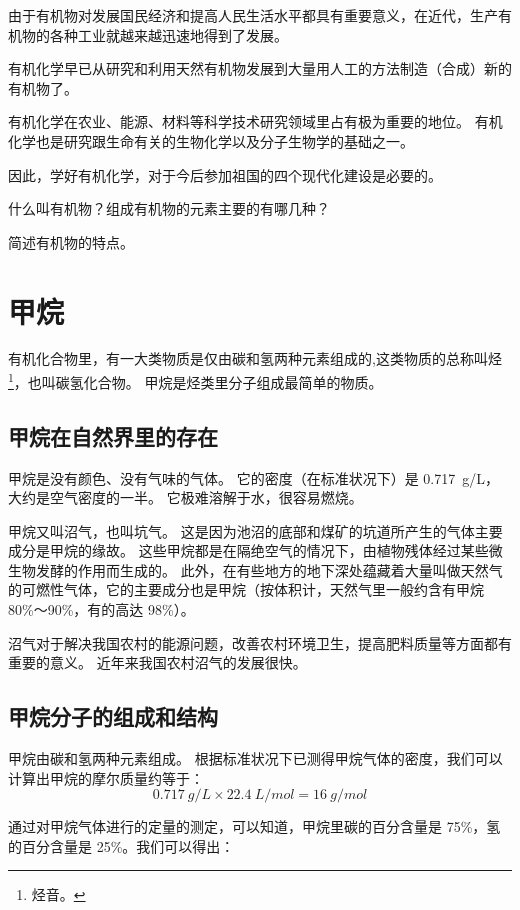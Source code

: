 由于有机物对发展国民经济和提高人民生活水平都具有重要意义，在近代，生产有机物的各种工业就越来越迅速地得到了发展。

有机化学早已从研究和利用天然有机物发展到大量用人工的方法制造（合成）新的有机物了。

有机化学在农业、能源、材料等科学技术研究领域里占有极为重要的地位。
有机化学也是研究跟生命有关的生物化学以及分子生物学的基础之一。

因此，学好有机化学，对于今后参加祖国的四个现代化建设是必要的。

\begin{Practice}[习题]
\begin{question}
  \item 什么叫有机物？组成有机物的元素主要的有哪几种？
  \item 简述有机物的特点。
\end{question}
\end{Practice}

\section{甲烷}
有机化合物里，有一大类物质是仅由碳和氢两种元素组成的,这类物质的总称叫烃\footnote{烃音。}，也叫碳氢化合物。
甲烷是烃类里分子组成最简单的物质。
\subsection{甲烷在自然界里的存在}
甲烷是没有颜色、没有气味的气体。
它的密度（在标准状况下）是 \qty{0.717}{g/L}，大约是空气密度的一半。
它极难溶解于水，很容易燃烧。

甲烷又叫沼气，也叫坑气。
这是因为池沼的底部和煤矿的坑道所产生的气体主要成分是甲烷的缘故。
这些甲烷都是在隔绝空气的情况下，由植物残体经过某些微生物发酵的作用而生成的。
此外，在有些地方的地下深处蕴藏着大量叫做天然气的可燃性气体，它的主要成分也是甲烷（按体积计，天然气里一般约含有甲烷  80\%～90\%，有的高达 98\%）。

沼气对于解决我国农村的能源问题，改善农村环境卫生，提高肥料质量等方面都有重要的意义。
近年来我国农村沼气的发展很快。

\subsection{甲烷分子的组成和结构}
甲烷由碳和氢两种元素组成。
根据标准状况下已测得甲烷气体的密度，我们可以计算出甲烷的摩尔质量约等于：
\[ \qty{0.717}{g/L} \times \qty{22.4}{L/mol} = \qty{16}{g/mol}\]

通过对甲烷气体进行的定量的测定，可以知道，甲烷里碳的百分含量是 75\%，氢的百分含量是 25\%。我们可以得出：

